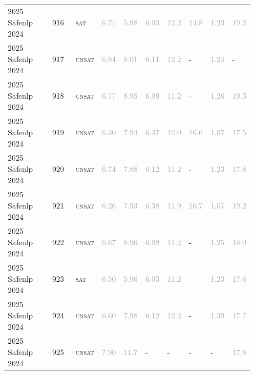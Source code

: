 \begin{center}
{\begin{longtable}{@{}llllllllll@{}}
2025 Safenlp 2024 & 916 & ~\textsc{sat} & \textcolor{darkgray}{6.71} & \textcolor{darkgray}{5.98} & \textcolor{darkgray}{6.03} & \textcolor{darkgray}{12.2} & \textcolor{darkgray}{14.8} & \textcolor{darkgray}{1.23} & \textcolor{darkgray}{19.2} \\
2025 Safenlp 2024 & 917 & ~\textsc{unsat} & \textcolor{darkgray}{6.84} & \textcolor{darkgray}{8.01} & \textcolor{darkgray}{6.11} & \textcolor{darkgray}{12.2} & - & \textcolor{darkgray}{1.24} & - \\
2025 Safenlp 2024 & 918 & ~\textsc{unsat} & \textcolor{darkgray}{6.77} & \textcolor{darkgray}{8.95} & \textcolor{darkgray}{6.09} & \textcolor{darkgray}{11.2} & - & \textcolor{darkgray}{1.26} & \textcolor{darkgray}{19.3} \\
2025 Safenlp 2024 & 919 & ~\textsc{unsat} & \textcolor{darkgray}{6.30} & \textcolor{darkgray}{7.94} & \textcolor{darkgray}{6.37} & \textcolor{darkgray}{12.0} & \textcolor{darkgray}{16.6} & \textcolor{darkgray}{1.07} & \textcolor{darkgray}{17.5} \\
2025 Safenlp 2024 & 920 & ~\textsc{unsat} & \textcolor{darkgray}{6.74} & \textcolor{darkgray}{7.88} & \textcolor{darkgray}{6.12} & \textcolor{darkgray}{11.2} & - & \textcolor{darkgray}{1.23} & \textcolor{darkgray}{17.8} \\
2025 Safenlp 2024 & 921 & ~\textsc{unsat} & \textcolor{darkgray}{6.26} & \textcolor{darkgray}{7.93} & \textcolor{darkgray}{6.38} & \textcolor{darkgray}{11.9} & \textcolor{darkgray}{16.7} & \textcolor{darkgray}{1.07} & \textcolor{darkgray}{19.2} \\
2025 Safenlp 2024 & 922 & ~\textsc{unsat} & \textcolor{darkgray}{6.67} & \textcolor{darkgray}{8.96} & \textcolor{darkgray}{6.08} & \textcolor{darkgray}{11.2} & - & \textcolor{darkgray}{1.25} & \textcolor{darkgray}{18.0} \\
2025 Safenlp 2024 & 923 & ~\textsc{sat} & \textcolor{darkgray}{6.50} & \textcolor{darkgray}{5.96} & \textcolor{darkgray}{6.03} & \textcolor{darkgray}{11.2} & - & \textcolor{darkgray}{1.23} & \textcolor{darkgray}{17.6} \\
2025 Safenlp 2024 & 924 & ~\textsc{unsat} & \textcolor{darkgray}{6.60} & \textcolor{darkgray}{7.98} & \textcolor{darkgray}{6.12} & \textcolor{darkgray}{12.2} & - & \textcolor{darkgray}{1.39} & \textcolor{darkgray}{17.7} \\
2025 Safenlp 2024 & 925 & ~\textsc{unsat} & \textcolor{darkgray}{7.90} & \textcolor{darkgray}{11.7} & - & - & - & - & \textcolor{darkgray}{17.8} \\

\end{longtable}}
\end{center}
